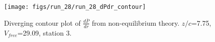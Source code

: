 \begin{figure}[H]
\centering
\texttt{[image: figs/run\_28/run\_28\_dPdr\_contour]}
\caption{Diverging contour plot of $\frac{d\bar{P}}{dr}$ from non-equilibrium theory. $z/c$=7.75, $V_{free}$=29.09, station 3.}
\label{fig:run_28_dPdr_contour}
\end{figure}


